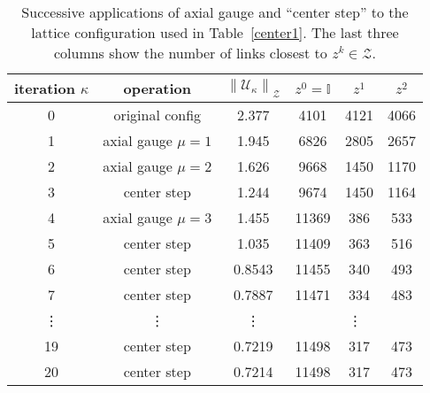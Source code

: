 \documentclass[preprint,aps,prd]{revtex4-2}
\newcommand{\zentrum}{\mathcal{Z}}       %
\newcommand{\config}{\mathcal{U}}
\newcommand\znorm[1]{\left\lVert #1 \right\rVert_\zentrum}
\begin{document}
\begin{table}
  \caption{Successive applications of axial gauge
    and ``center step'' to the lattice configuration
    used in Table~\ref{center1}.
    The last three columns show the number of links closest
    to $z^k \in \zentrum$.
    \label{center3}}
  \begin{tabular}{c|c|c|ccc}
    iteration $\kappa$ & operation & $\znorm{\config_\kappa}$
     & $z^0=\mathbb{I}$ & $z^1$ & $z^2$ \\
    \hline
    0 & original config    & 2.377  & 4101 & 4121 & 4066\\
    1 & axial gauge $\mu=1$& 1.945  & 6826 & 2805 & 2657\\
    2 & axial gauge $\mu=2$& 1.626  & 9668 & 1450 & 1170\\
    3 & center step        & 1.244  & 9674 & 1450 & 1164\\
    4 & axial gauge $\mu=3$& 1.455  & 11369 & 386 & 533\\
    5 & center step        & 1.035  & 11409 & 363 & 516\\
    6 & center step        & 0.8543 & 11455 & 340 & 493\\
    7 & center step        & 0.7887 & 11471 & 334 & 483\\
    \vdots & \vdots & \vdots & \multicolumn{3}{c}{\vdots}\\
    19 & center step       & 0.7219 & 11498 & 317 & 473\\
    20 & center step       & 0.7214 & 11498 & 317 & 473\\
  \end{tabular}
  \end{table}
\end{document}
